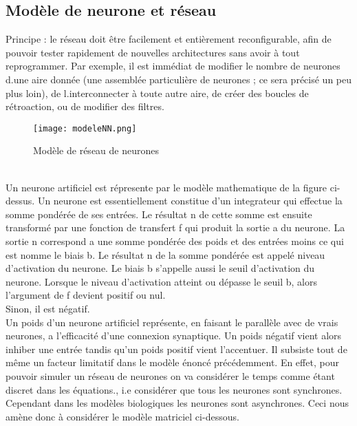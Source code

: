 \documentclass{article}
\begin{document}
                \subsection{Modèle de neurone et réseau }
Principe : le réseau doit être facilement et entièrement reconfigurable, afin de pouvoir tester rapidement de nouvelles architectures sans avoir à tout reprogrammer. Par exemple, il est immédiat de modifier le nombre de neurones d.une aire donnée (une assemblée particulière de neurones ; ce sera précisé un peu plus loin), de l.interconnecter à toute autre aire, de créer des boucles de rétroaction, ou de modifier des filtres.\\
\newpage
    \begin{figure}[hp]
	    \centering
	    \texttt{[image: modeleNN.png]}
	    \caption{Modèle de réseau de neurones }
    \end{figure}
\\
Un neurone artificiel est répresente par le modèle mathematique de la figure ci-dessus. Un neurone est essentiellement constitue d’un integrateur qui effectue la somme pondérée de ses entrées. Le résultat n de cette somme est ensuite transformé par une fonction de transfert f qui produit la sortie a du neurone.
La sortie n correspond a une somme pondérée des poids et des entrées moins ce qui est nomme le biais b. Le résultat n de la somme pondérée est appelé niveau d’activation du neurone. Le biais b s’appelle aussi le seuil d’activation du neurone. Lorsque le niveau
d’activation atteint ou dépasse le seuil b, alors l’argument de f devient positif ou nul.\\
Sinon, il est négatif.\\

Un poids d’un neurone artificiel représente, en faisant le parallèle avec de vrais neurones, a l’efficacité d’une connexion synaptique. Un poids négatif vient alors inhiber une entrée tandis qu’un poids positif vient l’accentuer. Il subsiste tout de même un facteur limitatif dans le modèle énoncé précédemment. En effet, pour pouvoir simuler un réseau de neurones on va considérer le temps comme étant discret dans les équations., i.e considérer que tous les neurones sont synchrones. Cependant dans les modèles biologiques les neurones sont asynchrones. Ceci nous amène donc à considérer le modèle matriciel ci-dessous.\\
\newpage
\end{document}
